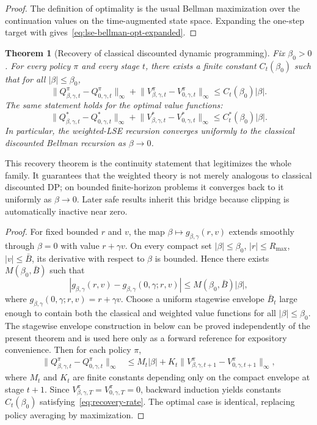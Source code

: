 \documentclass{article}
\newtheorem{theorem}{Theorem}[section]
\theoremstyle{remark}
\newcommand{\gbg}{g_{\beta,\gamma}}
\begin{document}
\begin{proof}
The definition of optimality is the usual Bellman maximization over the continuation values on the time-augmented state space.
Expanding the one-step target with  gives~\eqref{eq:lse-bellman-opt-expanded}.
\end{proof}

\begin{theorem}[Recovery of classical discounted dynamic programming]
\label{thm:recovery-classical}
Fix $\beta_0>0$.
For every policy $\pi$ and every stage $t$, there exists a finite constant $C_t(\beta_0)$ such that for all $|\beta|\le \beta_0$,
\begin{equation}
\bigl\|Q_{\beta,\gamma,t}^\pi - Q_{0,\gamma,t}^\pi\bigr\|_\infty
+
\bigl\|V_{\beta,\gamma,t}^\pi - V_{0,\gamma,t}^\pi\bigr\|_\infty
\le C_t(\beta_0)|\beta|.
\label{eq:recovery-rate}
\end{equation}
The same statement holds for the optimal value functions:
\[
\bigl\|Q_{\beta,\gamma,t}^* - Q_{0,\gamma,t}^*\bigr\|_\infty
+
\bigl\|V_{\beta,\gamma,t}^* - V_{0,\gamma,t}^*\bigr\|_\infty
\le C_t^*(\beta_0)|\beta|.
\]
In particular, the weighted-LSE recursion converges uniformly to the classical discounted Bellman recursion as $\beta\to 0$.
\end{theorem}

This recovery theorem is the continuity statement that legitimizes the whole family.
It guarantees that the weighted theory is not merely analogous to classical discounted DP; on bounded finite-horizon problems it converges back to it uniformly as $\beta\to 0$.
Later safe results inherit this bridge because clipping is automatically inactive near zero.

\begin{proof}
For fixed bounded $r$ and $v$, the map $\beta\mapsto \gbg(r,v)$ extends smoothly through $\beta=0$ with value $r+\gamma v$.
On every compact set $|\beta|\le \beta_0$, $|r|\le R_{\max}$, $|v|\le \bar B$, its derivative with respect to $\beta$ is bounded.
Hence there exists $M(\beta_0,\bar B)$ such that
\[
|\gbg(r,v)-\gbg(0,\gamma;r,v)| \le M(\beta_0,\bar B)|\beta|,
\]
where $\gbg(0,\gamma;r,v)=r+\gamma v$.
Choose a uniform stagewise envelope $\bar B_t$ large enough to contain both the classical and weighted value functions for all $|\beta|\le \beta_0$.
The stagewise envelope construction in  below can be proved independently of the present theorem and is used here only as a forward reference for expository convenience.
Then for each policy $\pi$,
\begin{align*}
\|Q_{\beta,\gamma,t}^\pi-Q_{0,\gamma,t}^\pi\|_\infty
&\le M_t|\beta| + K_t\|V_{\beta,\gamma,t+1}^\pi - V_{0,\gamma,t+1}^\pi\|_\infty,
\end{align*}
where $M_t$ and $K_t$ are finite constants depending only on the compact envelope at stage $t+1$.
Since $V_{\beta,\gamma,T}^\pi=V_{0,\gamma,T}^\pi=0$, backward induction yields constants $C_t(\beta_0)$ satisfying~\eqref{eq:recovery-rate}.
The optimal case is identical, replacing policy averaging by maximization.
\end{proof}
\end{document}
